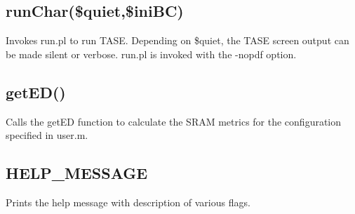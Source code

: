 \subsection{ runChar(\$quiet,\$iniBC)}
Invokes run.pl to run TASE. Depending on \$quiet, the TASE screen output can be made silent or verbose. run.pl is invoked with the -nopdf option.

\subsection{ getED()}
Calls the getED function to calculate the SRAM metrics for the configuration specified in user.m.

\subsection{ HELP\_MESSAGE}
Prints the help message with description of various flags.

